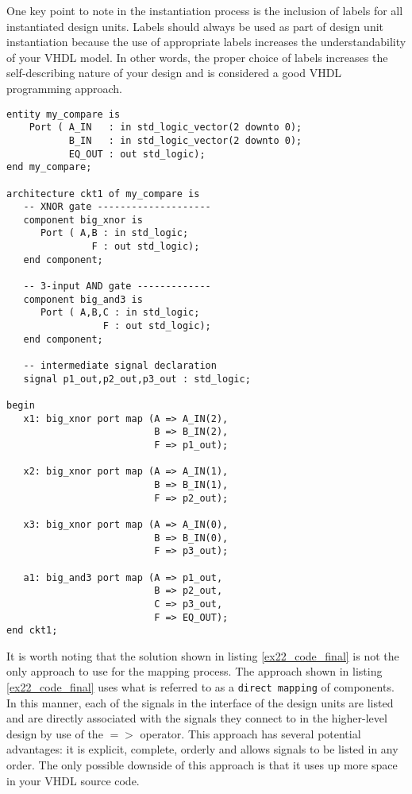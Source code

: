 One key point to note in the instantiation process is the inclusion of labels for all instantiated design units. Labels should always be used as part of design unit instantiation because the use of appropriate labels increases the understandability of your VHDL model. In other words, the proper choice of labels increases the self-describing nature of your design and is considered a good VHDL programming approach.

\begin{lstlisting}[label=ex22_code_final, caption=VHDL code for the design hierarchy for the 3-bit comparator.]
entity my_compare is
    Port ( A_IN   : in std_logic_vector(2 downto 0);
           B_IN   : in std_logic_vector(2 downto 0);
           EQ_OUT : out std_logic);
end my_compare;

architecture ckt1 of my_compare is 
   -- XNOR gate --------------------
   component big_xnor is
      Port ( A,B : in std_logic;
               F : out std_logic);
   end component;
 
   -- 3-input AND gate -------------
   component big_and3 is
      Port ( A,B,C : in std_logic;
                 F : out std_logic);
   end component;

   -- intermediate signal declaration
   signal p1_out,p2_out,p3_out : std_logic; 

begin
   x1: big_xnor port map (A => A_IN(2),
                          B => B_IN(2),
                          F => p1_out); 

   x2: big_xnor port map (A => A_IN(1),
                          B => B_IN(1),
                          F => p2_out); 
  
   x3: big_xnor port map (A => A_IN(0),
                          B => B_IN(0),
                          F => p3_out); 
  
   a1: big_and3 port map (A => p1_out,
                          B => p2_out, 
                          C => p3_out,
                          F => EQ_OUT); 
end ckt1;
\end{lstlisting}

It is worth noting that the solution shown in listing \ref{ex22_code_final} is not the only approach to use for the mapping process. The approach shown in listing \ref{ex22_code_final} uses what is referred to as a \texttt{direct mapping} of components. In this manner, each of the signals in the interface of the design units are listed and are directly associated with the signals they connect to in the higher-level design by use of the $=>$ operator. This approach has several potential advantages: it is explicit, complete, orderly and allows signals to be listed in any order. The only possible downside of this approach is that it uses up more space in your VHDL source code. 

